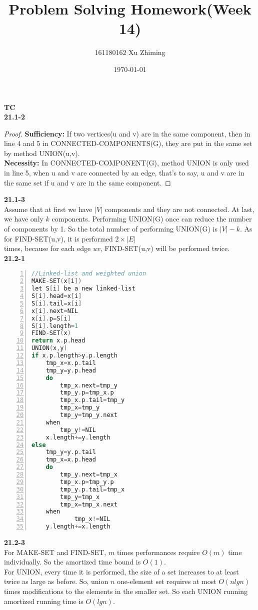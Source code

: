 \documentclass{article}
\begin{document}
\title{Problem Solving Homework(Week 14)}\author{161180162 Xu Zhiming}\date{\today}\maketitle
\setlength\parindent{0em}
\large\textbf{TC}\\
\normalsize\textbf{21.1-2}
\begin{proof}
\textbf{Sufficiency:} If two vertices(u and v) are in the same component, then in line 4 and 5 in CONNECTED-COMPONENTS(G), they are put in the same set by method UNION(u,v).\\
\textbf{Necessity:} In CONNECTED-COMPONENT(G), method UNION is only used in line 5, when u and v are connected by an edge, that's to say, u and v are in the same set if u and v are in the same component.
\end{proof}
\textbf{21.1-3}\\
Assume that at first we have $|V|$ components and they are not connected. At last, we have only $k$ components. Performing UNION(G) once can reduce the number of components by 1. So the total number of performing UNION(G) is $|V|-k$. As for FIND-SET(u,v), it is performed $2\times|E|$\\ times, because for each edge $uv$, FIND-SET(u,v) will be performed twice.\\
\textbf{21.2-1}
\begin{lstlisting}[language=C,numbers=left]
//Linked-list and weighted union
MAKE-SET(x[i])
let S[i] be a new linked-list
S[i].head=x[i]
S[i].tail=x[i]
x[i].next=NIL
x[i].p=S[i]
S[i].length=1
FIND-SET(x)
return x.p.head
UNION(x,y)
if x.p.length>y.p.length
	tmp_x=x.p.tail
	tmp_y=y.p.head
	do
		tmp_x.next=tmp_y
		tmp_y.p=tmp_x.p
		tmp_x.p.tail=tmp_y
		tmp_x=tmp_y
		tmp_y=tmp_y.next
	when
		tmp_y!=NIL
	x.length+=y.length
else
	tmp_y=y.p.tail
	tmp_x=x.p.head
	do
		tmp_y.next=tmp_x
		tmp_x.p=tmp_y.p
		tmp_y.p.tail=tmp_x
		tmp_y=tmp_x
		tmp_x=tmp_x.next
	when
			tmp_x!=NIL
	y.length+=x.length
\end{lstlisting}
\textbf{21.2-3}\\
For MAKE-SET and FIND-SET, $m$ times performances require $O(m)$ time individually. So the amortized time bound is $O(1)$.\\
For UNION, every time it is performed, the size of a set increases to at least twice as large as before. So, union $n$ one-element set requires at most $O(nlgn)$ times modifications to the elements in the smaller set. So each UNION running amortized running time is $O(lgn)$.\\
\end{document}
